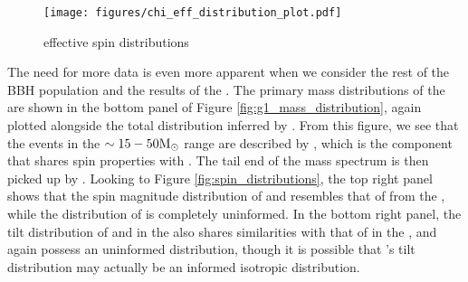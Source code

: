 \begin{figure}[hb]
    \begin{centering}
        \texttt{[image: figures/chi\_eff\_distribution\_plot.pdf]}
        \caption{effective spin distributions}
        \label{fig:chi_eff_distributions}
    \end{centering}
\end{figure}


The need for more data is even more apparent when we consider the rest of the BBH population and the results of the \comp{}. The primary mass distributions of the \comp{} are shown in the bottom panel of Figure \ref{fig:g1_mass_distribution}, again plotted alongside the total distribution inferred by \brucepaper{}. From this figure, we see that the events in the $\sim15-50 {\rm M}_\odot$ range are described by \contA{}, which is the component that shares spin properties with \first{}. The tail end of the mass spectrum is then picked up by \contB{}. Looking to Figure \ref{fig:spin_distributions}, the top right panel shows that the spin magnitude distribution of \first{} and \contA{} resembles that of \first{} from the \base{}, while the distribution of \contB{} is completely uninformed. In the bottom right panel, the tilt distribution of \first{} and \contA{} in the \comp{} also shares similarities with that of \first{} in the \base{}, and again \contB{} possess an uninformed distribution, though it is possible that \contB{}'s tilt distribution may actually be an informed isotropic distribution.


